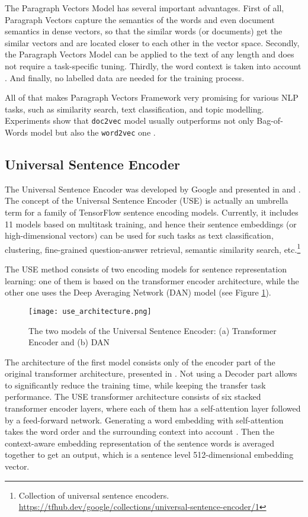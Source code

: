 \documentclass[fontsize=12pt,a4paper,twoside,openany]{scrbook}
\begin{document}
The Paragraph Vectors Model has several important advantages. First of all, Paragraph Vectors capture the semantics of the words and even document semantics in dense vectors, so that the similar words (or documents) get the similar vectors and are located closer to each other in the vector space. Secondly, the Paragraph Vectors Model can be applied to the text of any length and does not require a task-specific tuning. Thirdly, the word context is taken into account \parencite{Dai15}. And finally, no labelled data are needed for the training process. 

All of that makes Paragraph Vectors Framework very promising for various NLP tasks, such as similarity search, text classification, and topic modelling. Experiments show that \verb|doc2vec| model usually outperforms not only Bag-of-Words model but also the \verb|word2vec| one \parencite[see][]{Lau16, Le14}.

\subsection{Universal Sentence Encoder}
\label{sec:muse}

The Universal Sentence Encoder was developed by Google and presented in \parencite{Cer18a} and \parencite{Cer18b}. The concept of the Universal Sentence Encoder (USE) is actually an umbrella term for a family of TensorFlow sentence encoding models. Currently, it includes 11 models based on multitask training, and hence their sentence embeddings (or high-dimensional vectors) can be used for such tasks as text classification, clustering,  fine-grained question-answer retrieval, semantic similarity search, etc.\footnote{Collection of universal sentence encoders. \url{https://tfhub.dev/google/collections/universal-sentence-encoder/1}}

The USE method consists of two encoding models for sentence representation learning: one of them is based on the transformer encoder architecture, while the other one uses the Deep Averaging Network (DAN) model \parencite{Cer18a} (see Figure \ref{fig:use_architecture}).

\begin{figure}[h]
\centering
\texttt{[image: use\_architecture.png]}
\caption{The two models of the Universal Sentence Encoder: (a) Transformer Encoder and (b) DAN}
\label{fig:use_architecture}
\end{figure}

The architecture of the first model consists only of the encoder part of the original transformer architecture, presented in \parencite{Vaswani17}. Not using a Decoder part allows to significantly reduce the training time, while keeping the transfer task performance. The USE transformer architecture consists of six stacked transformer encoder layers, where each of them has a self-attention layer followed by a feed-forward network. Generating a word embedding with self-attention takes the word order and the surrounding context into account \parencite{Cer18a}. Then the context-aware embedding representation of the sentence words is averaged together to get an output, which is a sentence level 512-dimensional embedding vector. 
\end{document}
